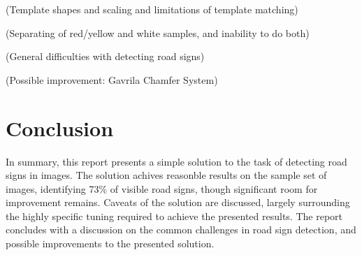 (Template shapes and scaling and limitations of template matching)

(Separating of red/yellow and white samples, and inability to do both)

(General difficulties with detecting road signs)

(Possible improvement: Gavrila Chamfer System)

\section{Conclusion}

In summary, this report presents a simple solution to the task of detecting road signs in images. The solution achives reasonble results on the sample set of images, identifying 73\% of visible road signs, though significant room for improvement remains. Caveats of the solution are discussed, largely surrounding the highly specific tuning required to achieve the presented results. The report concludes with a discussion on the common challenges in road sign detection, and possible improvements to the presented solution.
